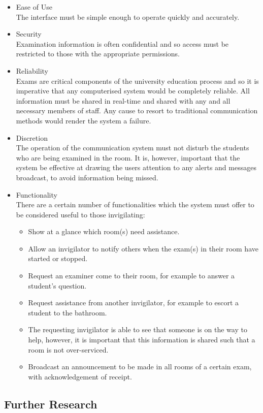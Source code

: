 \documentclass[a4paper, 12pt, notitlepage]{report}
\begin{document}
\begin{itemize}
\item Ease of Use\\
The interface must be simple enough to operate quickly and accurately.
\item Security\\
Examination information is often confidential and so access must be restricted to those  with the appropriate permissions.
\item Reliability\\
Exams are critical components of the university education process and so it is imperative that any computerised system would be completely reliable.  All information must be shared in real-time and shared with any and all necessary members of staff.  Any cause to resort to traditional communication methods would render the system a failure.
\item Discretion\\
The operation of the communication system must not disturb the students who are being examined in the room.  It is, however, important that the system be effective at drawing the users attention to any alerts and messages broadcast, to avoid information being missed.
\item Functionality\\
There are a certain number of functionalities which the system must offer to be considered useful to those invigilating:

\begin{itemize}
\item Show at a glance which room(s) need assistance.
\item Allow an invigilator to notify others when the exam(s) in their room have started or stopped.
\item Request an examiner come to their room, for example to answer a student's question.
\item Request assistance from another invigilator, for example to escort a student to the bathroom.
\item The requesting invigilator is able to see that someone is on the way to help, however, it is important that this information is shared such that a room is not over-serviced.
\item Broadcast an announcement to be made in all rooms of a certain exam, with acknowledgement of receipt.
\end{itemize}
\end{itemize}

\subsection{Further Research}
\end{document}
